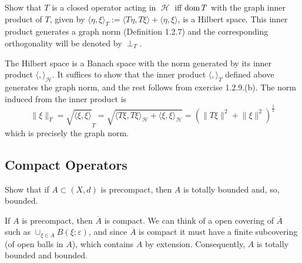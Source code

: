 \documentclass{article}
\theoremstyle{exercisestyle}
\newenvironment{exercise}[1]
  {\renewcommand\theinnerex{#1}\innerex}
  {\endinnerex}
\DeclareMathOperator{\hilbert}{\mathcal{H}}
\newcommand{\norm}[1]{\lVert #1 \rVert}
\newcommand{\closure}[1]{\overline{ #1}}
\newcommand{\inner}[2]{\langle #1, #2 \rangle}
\newcommand{\openball}[2]{B\left(#1;#2\right)}
\begin{document}
\begin{exercise}{1.2.28}
    Show that $T$ is a closed operator acting in $\hilbert$ iff $\operatorname{dom} T$ with the graph inner product of $T$, given by
    $\inner{\eta}{\xi}_T := \inner{T\eta}{T\xi} + \inner{\eta}{\xi}$, is a Hilbert space.
    This inner product generates a graph norm (Definition 1.2.7) and the corresponding orthogonality will be denoted by $\perp_T$.

    The Hilbert space is a Banach space with the norm generated by its inner product $\langle , \rangle_{\hilbert}$.
    It suffices to show that the inner product $\langle , \rangle_T$ defined above generates the graph norm, and the rest follows from exercise 1.2.9.(b).
    The norm induced from the inner product is
    $$\norm{\xi}_T = \sqrt{\inner{\xi}{\xi}}_T = \sqrt{\inner{T\xi}{T\xi}_{\hilbert} + \inner{\xi}{\xi}_{\hilbert}}= \left(\norm{T\xi}^2 + \norm{\xi}^2\right)^{\frac{1}{2}}$$
    which is precisely the graph norm.

\end{exercise}

\subsection{Compact Operators}

\begin{exercise}{1.3.1}
    Show that if $A \subset (X, d)$ is precompact, then $A$ is totally bounded and, so, bounded.

    If $A$ is precompact, then $\closure{A}$ is compact. We can think of a open covering of $\closure{A}$ such as $\cup_{\xi \in A} \openball{\xi}{\varepsilon}$,
    and since $\closure{A}$ is compact it must have a finite subcovering (of open balls in $A$), which contains $A$ by extension. Consequently, $A$ is totally bounded and bounded.

\end{exercise}
\end{document}
